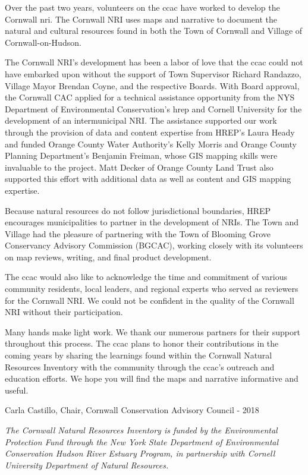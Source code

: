 Over the past two years, volunteers on the \gls{ccac} have 
worked to develop the Cornwall \gls{nri}. The Cornwall NRI uses maps and 
narrative to document the natural and cultural resources found in both the Town 
of Cornwall and Village of Cornwall-on-Hudson.
\par
The Cornwall NRI’s development has been a labor of love that the \gls{ccac} 
could not have embarked upon without the support of Town Supervisor Richard 
Randazzo, Village Mayor Brendan Coyne, and the respective Boards. With Board 
approval, the Cornwall CAC applied for a technical assistance opportunity from 
the NYS Department of Environmental Conservation’s \gls{hrep} and Cornell 
University for the development of an intermunicipal NRI. The assistance 
supported our work through the provision of data and content expertise from 
HREP’s Laura Heady and funded Orange County Water Authority’s Kelly Morris and 
Orange County Planning Department's Benjamin Freiman, whose GIS mapping skills 
were invaluable to the project. Matt Decker of Orange County Land Trust also 
supported this effort with additional data as well as content and GIS mapping 
expertise.
\par
Because natural resources do not follow jurisdictional boundaries, HREP 
encourages municipalities to partner in the development of NRIs. The Town and 
Village had the pleasure of partnering with the Town of Blooming Grove 
Conservancy Advisory Commission (BGCAC), working closely with its 
volunteers on map reviews, writing, and final product development.
\par
The \gls{ccac} would also like to acknowledge the time and commitment of 
various community residents, local leaders, and regional experts who served as 
reviewers for the Cornwall NRI. We could not be confident in the quality of 
the Cornwall NRI without their participation.
\par
Many hands make light work. We thank our numerous partners for their support 
throughout this process. The \gls{ccac} plans to honor their contributions in 
the coming years by sharing the learnings found within the Cornwall Natural 
Resources Inventory with the community through the \gls{ccac}’s outreach and 
education efforts. We hope you will find the maps and narrative informative and 
useful.
\par
\hfill Carla Castillo, Chair, Cornwall Conservation Advisory Council - 2018
\par
\textit{The Cornwall Natural Resources Inventory is funded by the Environmental 
Protection Fund through the New York State Department of Environmental 
Conservation Hudson River Estuary Program, in partnership with Cornell University Department of Natural Resources.}

